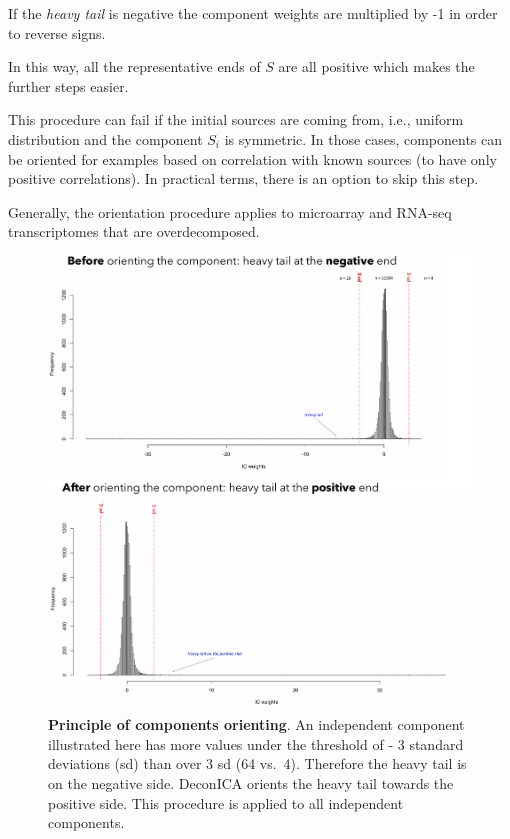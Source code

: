 \documentclass[12pt,]{book}
\theoremstyle{definition}
\theoremstyle{definition}
\theoremstyle{definition}
\theoremstyle{remark}
\begin{document}
If the \emph{heavy tail} is negative the component weights are
multiplied by -1 in order to reverse signs.

In this way, all the representative ends of \(S\) are all positive which
makes the further steps easier.

This procedure can fail if the initial sources are coming from, i.e.,
uniform distribution and the component \(S_i\) is symmetric. In those
cases, components can be oriented for examples based on correlation with
known sources (to have only positive correlations). In practical terms,
there is an option to skip this step.

Generally, the orientation procedure applies to microarray and RNA-seq
transcriptomes that are overdecomposed.

\begin{figure}

{\centering \includegraphics[width=0.7\linewidth]{figures-ext/orienting} 

}

\caption[Principle of components orienting]{\textbf{Principle of components orienting}. An
independent component illustrated here has more values under the
threshold of - 3 standard deviations (sd) than over 3 sd (64 vs.~4).
Therefore the heavy tail is on the negative side. DeconICA orients the
heavy tail towards the positive side. This procedure is applied to all
independent components.}\label{fig:orienting}
\end{figure}
\end{document}
